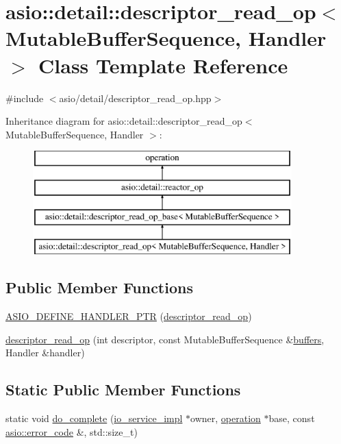 \hypertarget{classasio_1_1detail_1_1descriptor__read__op}{}\section{asio\+:\+:detail\+:\+:descriptor\+\_\+read\+\_\+op$<$ Mutable\+Buffer\+Sequence, Handler $>$ Class Template Reference}
\label{classasio_1_1detail_1_1descriptor__read__op}


{\ttfamily \#include $<$asio/detail/descriptor\+\_\+read\+\_\+op.\+hpp$>$}

Inheritance diagram for asio\+:\+:detail\+:\+:descriptor\+\_\+read\+\_\+op$<$ Mutable\+Buffer\+Sequence, Handler $>$\+:\begin{figure}[H]
\begin{center}
\leavevmode
\includegraphics[height=4.000000cm]{classasio_1_1detail_1_1descriptor__read__op}
\end{center}
\end{figure}
\subsection*{Public Member Functions}
\begin{DoxyCompactItemize}
\item 
\hyperlink{classasio_1_1detail_1_1descriptor__read__op_ac501a87d81bfc7290a350358455ec4f7}{A\+S\+I\+O\+\_\+\+D\+E\+F\+I\+N\+E\+\_\+\+H\+A\+N\+D\+L\+E\+R\+\_\+\+P\+T\+R} (\hyperlink{classasio_1_1detail_1_1descriptor__read__op}{descriptor\+\_\+read\+\_\+op})
\item 
\hyperlink{classasio_1_1detail_1_1descriptor__read__op_ae7f5eb315ea37563616c7d92dea8bd3c}{descriptor\+\_\+read\+\_\+op} (int descriptor, const Mutable\+Buffer\+Sequence \&\hyperlink{group__async__read_ga54dede45c3175148a77fe6635222c47d}{buffers}, Handler \&handler)
\end{DoxyCompactItemize}
\subsection*{Static Public Member Functions}
\begin{DoxyCompactItemize}
\item 
static void \hyperlink{classasio_1_1detail_1_1descriptor__read__op_a7648551b3bf757f7a2610d17d0a00b1d}{do\+\_\+complete} (\hyperlink{namespaceasio_1_1detail_a6d61d9b8e53c11288be549d82aec5a42}{io\+\_\+service\+\_\+impl} $\ast$owner, \hyperlink{namespaceasio_1_1detail_a338968609bec20e37145309f8f9ec936}{operation} $\ast$base, const \hyperlink{classasio_1_1error__code}{asio\+::error\+\_\+code} \&, std\+::size\+\_\+t)
\end{DoxyCompactItemize}
